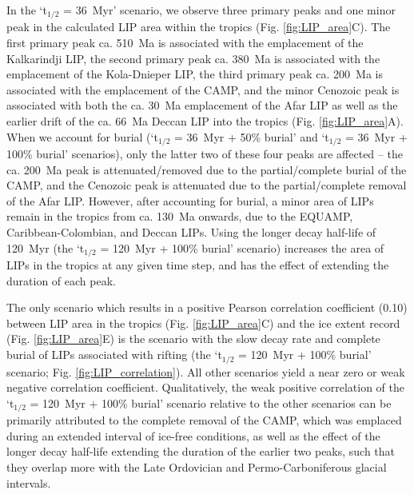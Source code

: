 \documentclass[11pt,letterpaper]{article}
\begin{document}
In the `t$_{1/2}$ = 36~Myr' scenario, we observe three primary peaks and one minor peak in the calculated LIP area within the tropics (Fig. \ref{fig:LIP_area}C). The first primary peak ca. 510~Ma is associated with the emplacement of the Kalkarindji LIP, the second primary peak ca. 380~Ma is associated with the emplacement of the Kola-Dnieper LIP, the third primary peak ca. 200~Ma is associated with the emplacement of the CAMP, and the minor Cenozoic peak is associated with both the ca. 30~Ma emplacement of the Afar LIP as well as the earlier drift of the ca. 66~Ma Deccan LIP into the tropics (Fig. \ref{fig:LIP_area}A). When we account for burial (`t$_{1/2}$ = 36~Myr + 50\% burial' and `t$_{1/2}$ = 36~Myr + 100\% burial' scenarios), only the latter two of these four peaks are affected -- the ca. 200~Ma peak is attenuated/removed due to the partial/complete burial of the CAMP, and the Cenozoic peak is attenuated due to the partial/complete removal of the Afar LIP. However, after accounting for burial, a minor area of LIPs remain in the tropics from ca. 130~Ma onwards, due to the EQUAMP, Caribbean-Colombian, and Deccan LIPs. Using the longer decay half-life of 120~Myr (the `t$_{1/2}$ = 120~Myr + 100\% burial' scenario) increases the area of LIPs in the tropics at any given time step, and has the effect of extending the duration of each peak.

The only scenario which results in a positive Pearson correlation coefficient (0.10) between LIP area in the tropics (Fig. \ref{fig:LIP_area}C) and the ice extent record (Fig. \ref{fig:LIP_area}E) is the scenario with the slow decay rate and complete burial of LIPs associated with rifting (the `t$_{1/2}$ = 120~Myr + 100\% burial' scenario; Fig. \ref{fig:LIP_correlation}). All other scenarios yield a near zero or weak negative correlation coefficient. Qualitatively, the weak positive correlation of the `t$_{1/2}$ = 120~Myr + 100\% burial' scenario relative to the other scenarios can be primarily attributed to the complete removal of the CAMP, which was emplaced during an extended interval of ice-free conditions, as well as the effect of the longer decay half-life extending the duration of the earlier two peaks, such that they overlap more with the Late Ordovician and Permo-Carboniferous glacial intervals.
\end{document}
